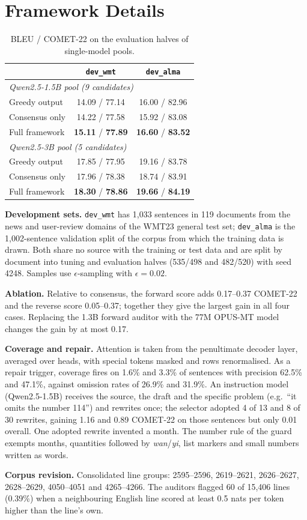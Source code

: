 \documentclass[11pt]{article}
\begin{document}


\appendix

\section{Framework Details}
\label{sec:appendix}

\begin{table}[h]
\centering
\small
\setlength{\tabcolsep}{4pt}
\begin{tabular}{lcc}
\toprule
 & \texttt{dev\_wmt} & \texttt{dev\_alma} \\
\midrule
\multicolumn{3}{l}{\emph{Qwen2.5-1.5B pool (9 candidates)}}\\
Greedy output  & 14.09 / 77.14 & 16.00 / 82.96 \\
Consensus only & 14.22 / 77.58 & 15.92 / 83.08 \\
Full framework & \textbf{15.11} / \textbf{77.89} & \textbf{16.60} / \textbf{83.52} \\
\midrule
\multicolumn{3}{l}{\emph{Qwen2.5-3B pool (5 candidates)}}\\
Greedy output  & 17.85 / 77.95 & 19.16 / 83.78 \\
Consensus only & 17.96 / 78.38 & 18.74 / 83.91 \\
Full framework & \textbf{18.30} / \textbf{78.86} & \textbf{19.66} / \textbf{84.19} \\
\bottomrule
\end{tabular}
\caption{BLEU / COMET-22 on the evaluation halves of single-model pools.}
\label{tab:audit_results}
\end{table}

\textbf{Development sets.} \texttt{dev\_wmt} has 1,033 sentences in 119 documents from the news and user-review domains of the WMT23 general test set; \texttt{dev\_alma} is the 1,002-sentence validation split of the corpus from which the training data is drawn. Both share no source with the training or test data and are split by document into tuning and evaluation halves (535/498 and 482/520) with seed 4248. Samples use $\epsilon$-sampling with $\epsilon=0.02$.

\textbf{Ablation.} Relative to consensus, the forward score adds 0.17--0.37 COMET-22 and the reverse score 0.05--0.37; together they give the largest gain in all four cases. Replacing the 1.3B forward auditor with the 77M OPUS-MT model changes the gain by at most 0.17.

\textbf{Coverage and repair.} Attention is taken from the penultimate decoder layer, averaged over heads, with special tokens masked and rows renormalised. As a repair trigger, coverage fires on 1.6\% and 3.3\% of sentences with precision 62.5\% and 47.1\%, against omission rates of 26.9\% and 31.9\%. An instruction model (Qwen2.5-1.5B) receives the source, the draft and the specific problem (e.g.\ ``it omits the number 114'') and rewrites once; the selector adopted 4 of 13 and 8 of 30 rewrites, gaining 1.16 and 0.89 COMET-22 on those sentences but only 0.01 overall. One adopted rewrite invented a month. The number rule of the guard exempts months, quantities followed by \emph{wan}/\emph{yi}, list markers and small numbers written as words.

\textbf{Corpus revision.} Consolidated line groups: 2595--2596, 2619--2621, 2626--2627, 2628--2629, 4050--4051 and 4265--4266. The auditors flagged 60 of 15,406 lines (0.39\%) when a neighbouring English line scored at least 0.5 nats per token higher than the line's own.
\end{document}
